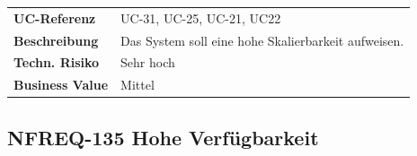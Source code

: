 \begin{longtable}[c]{@{}ll@{}}
\toprule
\begin{minipage}[t]{0.20\columnwidth}\raggedright\strut
\textbf{UC-Referenz}
\strut\end{minipage} &
\begin{minipage}[t]{0.74\columnwidth}\raggedright\strut
UC-31, UC-25, UC-21, UC22
\strut\end{minipage}\tabularnewline
\begin{minipage}[t]{0.20\columnwidth}\raggedright\strut
\textbf{Beschreibung}
\strut\end{minipage} &
\begin{minipage}[t]{0.74\columnwidth}\raggedright\strut
Das System soll eine hohe Skalierbarkeit aufweisen.
\strut\end{minipage}\tabularnewline
\begin{minipage}[t]{0.20\columnwidth}\raggedright\strut
\textbf{Techn. Risiko}
\strut\end{minipage} &
\begin{minipage}[t]{0.74\columnwidth}\raggedright\strut
Sehr hoch
\strut\end{minipage}\tabularnewline
\begin{minipage}[t]{0.20\columnwidth}\raggedright\strut
\textbf{Business Value}
\strut\end{minipage} &
\begin{minipage}[t]{0.74\columnwidth}\raggedright\strut
Mittel
\strut\end{minipage}\tabularnewline
\bottomrule
\end{longtable}

\subsection{NFREQ-135 Hohe
Verfügbarkeit}\label{nfreq-135-hohe-verfuxfcgbarkeit}

